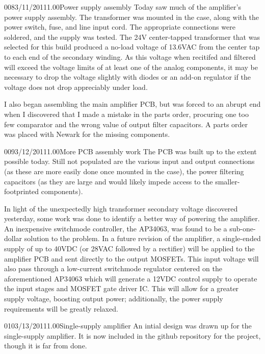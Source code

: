 \documentclass[12pt,letterpaper,onecolumn]{article}
\begin{document}
\begin{nbentry}{008}{3/11/2011}{1.00}{Power supply assembly}
Today saw much of the amplifier's power supply assembly.  The transformer was mounted in the case, along with the power switch, fuse, and line input cord.  The appropriate connections were soldered, and the supply was tested.  The 24V center-tapped transformer that was selected for this build produced a no-load voltage of 13.6VAC from the center tap to each end of the secondary winding.  As this voltage when recitifed and filtered will exceed the voltage limits of at least one of the analog components, it may be necessary to drop the voltage slightly with diodes or an add-on regulator if the voltage does not drop appreciably under load.

I also began assembling the main amplifier PCB, but was forced to an abrupt end when I discovered that I made a mistake in the parts order, procuring one too few comparator and the wrong value of output filter capacitors.  A parts order was placed with Newark for the missing components.
\end{nbentry}

\begin{nbentry}{009}{3/12/2011}{1.00}{More PCB assembly work}
The PCB was built up to the extent possible today.  Still not populated are the various input and output connections (as these are more easily done once mounted in the case), the power filtering capacitors (as they are large and would likely impede access to the smaller-footprinted components).

In light of the unexpectedly high transformer secondary voltage discovered yesterday, some work was done to identify a better way of powering the amplifier.  An inexpensive switchmode controller, the AP34063, was found to be a sub-one-dollar solution to the problem.  In a future revision of the amplifier, a single-ended supply of up to 40VDC (or 28VAC followed by a rectifier) will be applied to the amplifier PCB and sent directly to the output MOSFETs.  This input voltage will also pass through a low-current switchmode regulator centered on the aforementioned AP34063 which will generate a 12VDC control supply to operate the input stages and MOSFET gate driver IC.  This will allow for a greater supply voltage, boosting output power; additionally, the power supply requirements will be greatly relaxed.
\end{nbentry}

\begin{nbentry}{010}{3/13/2011}{1.00}{Single-supply amplifier}
An intial design was drawn up for the single-supply amplifier.  It is now included in the github repository for the project, though it is far from done.
\end{nbentry}
\end{document}
